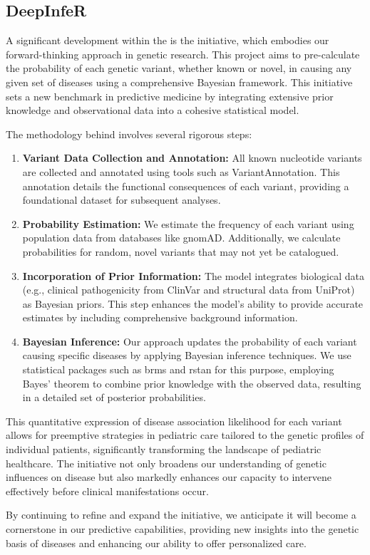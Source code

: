 \subsection{DeepInfeR}

A significant development within the \pmu is the \deepinfer initiative, which embodies our forward-thinking approach in genetic research. This project aims to pre-calculate the probability of each genetic variant, whether known or novel, in causing any given set of diseases using a comprehensive Bayesian framework. This initiative sets a new benchmark in predictive medicine by integrating extensive prior knowledge and observational data into a cohesive statistical model.

The methodology behind \deepinfer involves several rigorous steps:
\begin{enumerate}
    \item \textbf{Variant Data Collection and Annotation:} All known nucleotide variants are collected and annotated using tools such as VariantAnnotation. This annotation details the functional consequences of each variant, providing a foundational dataset for subsequent analyses.
    \item \textbf{Probability Estimation:} We estimate the frequency of each variant using population data from databases like gnomAD. Additionally, we calculate probabilities for random, novel variants that may not yet be catalogued.
    \item \textbf{Incorporation of Prior Information:} The model integrates biological data (e.g., clinical pathogenicity from ClinVar and structural data from UniProt) as Bayesian priors. This step enhances the model's ability to provide accurate estimates by including comprehensive background information.
    \item \textbf{Bayesian Inference:} Our approach updates the probability of each variant causing specific diseases by applying Bayesian inference techniques. We use statistical packages such as brms and rstan for this purpose, employing Bayes' theorem to combine prior knowledge with the observed data, resulting in a detailed set of posterior probabilities.
\end{enumerate}

This quantitative expression of disease association likelihood for each variant allows for preemptive strategies in pediatric care tailored to the genetic profiles of individual patients, significantly transforming the landscape of pediatric healthcare. The \deepinfer initiative not only broadens our understanding of genetic influences on disease but also markedly enhances our capacity to intervene effectively before clinical manifestations occur.

By continuing to refine and expand the \deepinfer initiative, we anticipate it will become a cornerstone in our predictive capabilities, providing new insights into the genetic basis of diseases and enhancing our ability to offer personalized care.
